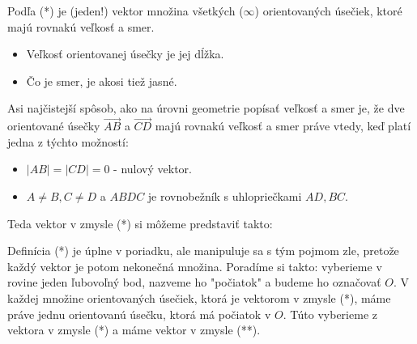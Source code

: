 \documentclass[11pt]{article}
\renewcommand{\vec}[1]{\overrightarrow{#1}}
\begin{document}
Podľa (*) je (jeden!) vektor množina všetkých ($\infty$) orientovaných úsečiek, ktoré majú rovnakú veľkosť a smer.

\begin{itemize}
    \item Veľkosť orientovanej úsečky je jej dĺžka.
    \item Čo je smer, je akosi tiež jasné.
\end{itemize}

Asi najčistejší spôsob, ako na úrovni geometrie popísať veľkosť a smer je, že dve orientované úsečky $\vec{AB}$ a $\vec{CD}$ majú rovnakú veľkosť a smer práve vtedy, keď platí jedna z týchto možností:
\begin{itemize}
    \item $|AB|=|CD|=0$ - nulový vektor.
    \item $A \neq B, C \neq D$ a $ABDC$ je rovnobežník s uhlopriečkami $AD, BC$.
\end{itemize}

\begin{center}
\end{center}

Teda vektor v zmysle (*) si môžeme predstaviť takto:
\begin{center}
\end{center}

Definícia (*) je úplne v poriadku, ale manipuluje sa s tým pojmom zle, pretože každý vektor je potom nekonečná množina.
Poradíme si takto: vyberieme v rovine jeden ľubovoľný bod, nazveme ho "počiatok" a budeme ho označovať $O$. V každej množine orientovaných úsečiek, ktorá je vektorom v zmysle (*), máme práve jednu orientovanú úsečku, ktorá má počiatok v $O$. Túto vyberieme z vektora v zmysle (*) a máme vektor v zmysle (**).
\end{document}
